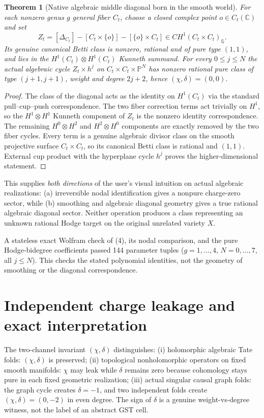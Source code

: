 \documentclass[11pt]{article}
\newtheorem{theorem}{Theorem}
\begin{document}
\begin{theorem}[Native algebraic middle diagonal born in the smooth world]
For each nonzero genus $g$ general fiber $C_t$, choose
a closed complex point $o\in C_t(\mathbb C)$ and set
\[
 Z_t=[\Delta_{C_t}]-[C_t\times\{o\}]
                   -[\{o\}\times C_t]
 \in CH^1(C_t\times C_t)_{\mathbb Q}.
\]
Its genuine canonical Betti class is nonzero, rational and
of pure type $(1,1)$, and lies in the
$H^1(C_t)\otimes H^1(C_t)$ Kunneth summand.
For every $0\leq j\leq N$ the actual algebraic cycle
$Z_t\times h^j$ on
$C_t\times C_t\times\mathbb P^N$
has nonzero rational pure class of type $(j+1,j+1)$,
weight and degree $2j+2$, hence $(\chi,\delta)=(0,0)$.
\end{theorem}
\begin{proof}
The class of the diagonal acts as the identity on $H^1(C_t)$
via the standard pull--cup--push correspondence.  The two
fiber correction terms act trivially on $H^1$, so the
$H^1\otimes H^1$ Kunneth component of $Z_t$ is the
nonzero identity correspondence.  The remaining $H^0\otimes H^2$
and $H^2\otimes H^0$ components are exactly removed by the
two fiber cycles. Every term is a genuine algebraic divisor
class on the smooth projective surface $C_t\times C_t$,
so its canonical Betti class is rational and $(1,1)$.
External cup product with the hyperplane cycle $h^j$
proves the higher-dimensional statement.
\end{proof}

This supplies \emph{both directions} of the user's visual
intuition on actual algebraic realizations:
(a) irreversible nodal identification gives a nonpure
charge-zero sector, while (b) smoothing and algebraic diagonal
geometry gives a true rational algebraic diagonal sector.
Neither operation produces a class representing an unknown
rational Hodge target on the original unrelated variety $X$.

A stateless exact Wolfram check of (4), its nodal comparison,
and the pure Hodge-bidegree coefficients passed 144 parameter
tuples ($g=1,\dots,4$, $N=0,\dots,7$, all $j\leq N$).
This checks the stated polynomial identities, not
the geometry of smoothing or the diagonal correspondence.

\section{Independent charge leakage and exact interpretation}
The two-channel invariant $(\chi,\delta)$ distinguishes:
(i) holomorphic algebraic Tate folds: $(\chi,\delta)$ is preserved;
(ii) topological nonholomorphic operators on fixed smooth
manifolds: $\chi$ may leak while $\delta$ remains zero because
cohomology stays pure in each fixed geometric realization;
(iii) actual singular causal graph folds: the graph cycle creates
$\delta=-1$, and two independent folds create
$(\chi,\delta)=(0,-2)$ in even degree.
The sign of $\delta$ is a genuine weight-vs-degree witness, not
the label of an abstract GST cell.
\end{document}
